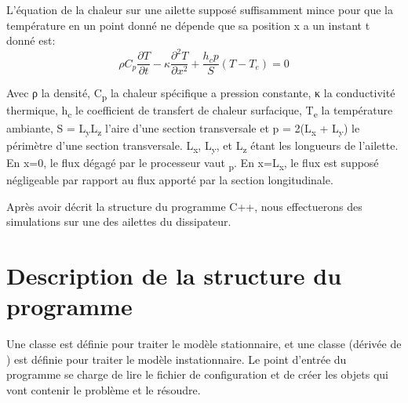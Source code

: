 \documentclass[11pt]{article} %
\begin{document}
L’équation de la chaleur sur une ailette supposé suffisamment mince pour que la température en un point donné ne dépende que sa position x a un instant t donné est:
\begin{equation}
	\rho C_{p}\frac{\partial T} {\partial t} - \kappa \frac{\partial ^{2}T}{\partial x^{2}} + \frac{h_{c}p}{S} (T-T_{e}) = 0
\end{equation}
\par Avec ρ la densité, C\textsubscript p la chaleur spécifique a pression constante, κ la conductivité thermique, h\textsubscript c le coefficient de transfert de chaleur surfacique, T\textsubscript e la température ambiante, S = L\textsubscript yL\textsubscript z l'aire d'une section transversale et p = 2(L\textsubscript x + L\textsubscript y) le périmètre d'une section transversale. L\textsubscript x, L\textsubscript y, et L\textsubscript z étant les longueurs de l’ailette. En x=0, le flux dégagé par le processeur vaut \textPhi \textsubscript p. En x=L\textsubscript x, le flux est supposé négligeable par rapport au flux apporté par la section longitudinale.

\par Après avoir décrit la structure du programme C++, nous effectuerons des simulations sur une des ailettes du dissipateur.


\section{Description de la structure du programme }

Une classe  est définie pour traiter le modèle stationnaire, et une classe  (dérivée de ) est définie pour traiter le modèle instationnaire. Le point d’entrée du programme se charge de lire le fichier de configuration et de créer les objets qui vont contenir le problème et le résoudre.
\end{document}
